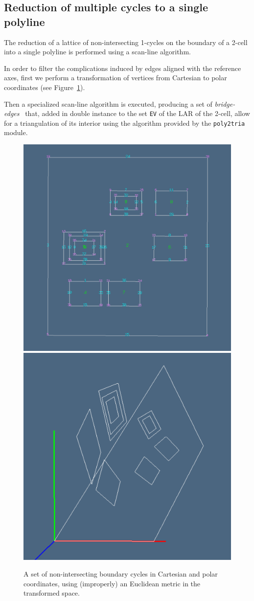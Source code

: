 \documentclass[11pt,oneside]{article}	%
\begin{document}
\subsection{Reduction of multiple cycles to a single polyline}
\label{sec:singlepolyline}

The reduction of a lattice of non-intersecting 1-cycles on the boundary of a 2-cell into a single polyline is performed using a scan-line algorithm.

In order to filter the complications induced by edges aligned with the reference axes, first we perform a transformation of vertices from Cartesian to polar coordinates (see Figure~\ref{fig:polarholes}).

Then a specialized scan-line algorithm is executed, producing a set of \emph{bridge-edges}~\cite{Yamaguchi:85} that, added in double instance to the set \texttt{EV} of the LAR of the 2-cell, allow for a triangulation of its interior using the algorithm provided by the \texttt{poly2tria} module.

\begin{figure}[htbp] %
   \centering
   \includegraphics[height=0.33\linewidth,width=0.33\linewidth]{images/lattice1} 
   \includegraphics[height=0.33\linewidth,width=0.33\linewidth]{images/polarholes} 
   \caption{A set of non-intersecting boundary cycles in Cartesian and polar coordinates, using (improperly) an Euclidean metric in the transformed space.}
   \label{fig:polarholes}
\end{figure}
\end{document}
